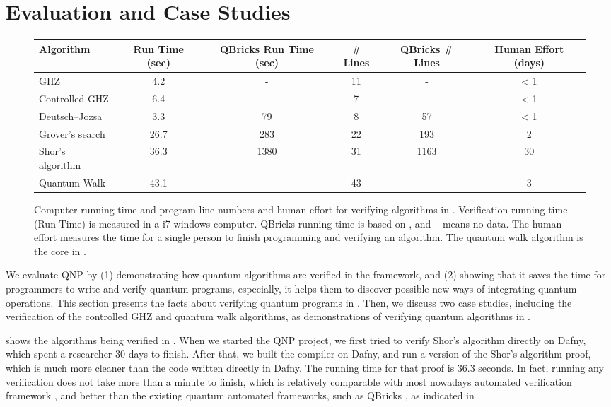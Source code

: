 \section{Evaluation and Case Studies}
\label{sec:arith-oqasm}

\begin{figure*}[t]
{\footnotesize
\begin{tabular}{|l|c|c|c|c|c|}
\hline
Algorithm & Run Time (sec) & QBricks Run Time (sec) & \# Lines& QBricks \# Lines  & Human Effort (days)\\
                     \hline
GHZ & 4.2 & - & 11 & - & < 1 \\
Controlled GHZ & 6.4 & - & 7 & - & < 1 \\
Deutsch–Jozsa & 3.3 & 79 & 8 & 57  & < 1 \\
Grover's search & 26.7 & 283 & 22 & 193 &  2\\
Shor's algorithm & 36.3 & 1380  & 31 & 1163 & 30  \\
Quantum Walk & 43.1 & - & 43 & - & 3 \\
\hline                           
\end{tabular}
}
\caption{Computer running time and program line numbers and human effort for verifying algorithms in \qafny. Verification running time (Run Time) is measured in a i7 windows computer. 
QBricks running time is based on \cite{qbricks}, and \texttt{-} means no data.
The human effort measures the time for a single person to finish programming and verifying an algorithm. The quantum walk algorithm is the core in \cite{Wong_2022}.}
\label{fig:circ-evaluation}
\end{figure*}

We evaluate QNP by (1) demonstrating how quantum algorithms are verified in the framework, and (2) showing that it saves the time for programmers to write and verify quantum programs, especially, it helps them to discover possible new ways of integrating quantum operations.
%
This section presents the facts about verifying quantum programs in \qafny. Then, we discuss two case studies, including the verification of the controlled GHZ and quantum walk algorithms, as demonstrations of verifying quantum algorithms in \qafny.

 shows the algorithms being verified in \qafny. When we started the QNP project, we first tried to verify Shor's algorithm directly on Dafny, which spent a researcher 30 days to finish. After that, we built the \qafny compiler on Dafny, and run a \qafny version of the Shor's algorithm proof, which is much more cleaner than the code written directly in Dafny. The running time for that proof is 36.3 seconds. In fact, running any \qafny verification does not take more than a minute to finish, which is relatively comparable with most nowadays automated verification framework \cite{DBLP:conf/pldi/Qiu0SM13,dafnyref}, and better than the existing quantum automated frameworks, such as QBricks \cite{qbricks}, as indicated in .


